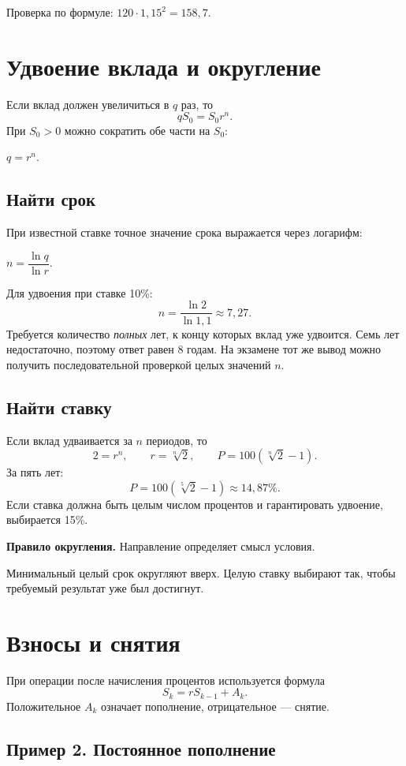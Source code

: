 \documentclass[a4paper,12pt]{article}
\newcommand{\term}[1]{\textcolor{darkaccent}{\textbf{#1}}}
\newcommand{\formula}[1]{%
  \begin{center}
    \begin{minipage}{0.92\linewidth}
      \centering\large\color{darkaccent}#1
    \end{minipage}
  \end{center}}
\begin{document}
Проверка по формуле: $120\cdot1{,}15^2=158{,}7$.

\section{Удвоение вклада и округление}

Если вклад должен увеличиться в $q$ раз, то
\[
qS_0=S_0r^n.
\]
При $S_0>0$ можно сократить обе части на $S_0$:
\formula{$q=r^n$.}

\subsection{Найти срок}

При известной ставке точное значение срока выражается через логарифм:
\formula{$n=\dfrac{\ln q}{\ln r}$.}

Для удвоения при ставке 10\%:
\[
n=\frac{\ln2}{\ln1{,}1}\approx7{,}27.
\]
Требуется количество \emph{полных} лет, к концу которых вклад уже удвоится. Семь лет недостаточно, поэтому ответ равен 8 годам. На экзамене тот же вывод можно получить последовательной проверкой целых значений $n$.

\subsection{Найти ставку}

Если вклад удваивается за $n$ периодов, то
\[
2=r^n,\qquad r=\sqrt[n]{2},\qquad P=100\left(\sqrt[n]{2}-1\right).
\]
За пять лет:
\[
P=100\left(\sqrt[5]{2}-1\right)\approx14{,}87\%.
\]
Если ставка должна быть целым числом процентов и гарантировать удвоение, выбирается 15\%.

\term{Правило округления.} Направление определяет смысл условия.

Минимальный целый срок округляют вверх. Целую ставку выбирают так, чтобы требуемый результат уже был достигнут.

\section{Взносы и снятия}

При операции после начисления процентов используется формула
\[
S_k=rS_{k-1}+A_k.
\]
Положительное $A_k$ означает пополнение, отрицательное --- снятие.

\subsection{Пример 2. Постоянное пополнение}
\end{document}
